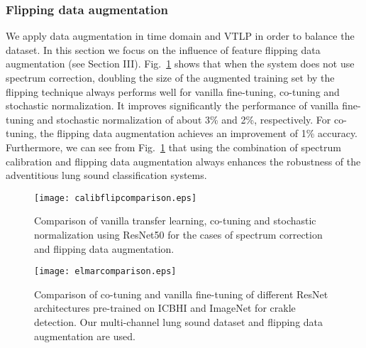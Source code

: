 \documentclass[journal]{IEEEtran}
\begin{document}
\subsubsection{Flipping data augmentation}
We apply data augmentation in time domain and VTLP in order to balance the dataset. In this section we focus on the influence of feature flipping data augmentation (see Section III). Fig.~\ref{fig:calibflipcomparision} shows that when the system does not use spectrum correction, doubling the size of the augmented training set by the flipping technique always performs well for vanilla fine-tuning, co-tuning and stochastic normalization. It improves significantly the performance of vanilla fine-tuning and stochastic normalization of about 3\% and 2\%, respectively. For co-tuning, the flipping data augmentation achieves an improvement of 1\% accuracy. Furthermore, we can see from Fig.~\ref{fig:calibflipcomparision} that using the combination of spectrum calibration and flipping data augmentation always enhances the robustness of the adventitious lung sound classification systems. 

\begin{figure}[t]
	\centering
    \texttt{[image: calibflipcomparison.eps]}
	\caption{Comparison of vanilla transfer learning, co-tuning and stochastic normalization using ResNet50 for the cases of spectrum correction and flipping data augmentation.}
	\label{fig:calibflipcomparision}
\end{figure}
\begin{figure}[t]
	\centering
    \texttt{[image: elmarcomparison.eps]}
	\caption{Comparison of co-tuning and vanilla fine-tuning of different ResNet architectures pre-trained on ICBHI and ImageNet for crakle detection. Our multi-channel lung sound dataset and flipping data augmentation are used.}
	\label{fig:elmarcomparision}
\end{figure}
\end{document}
